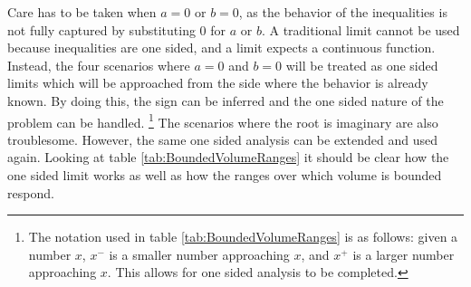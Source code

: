 Care has to be taken when $a=0$ or $b=0$, as the behavior of the inequalities is not fully captured by substituting $0$ for $a$ or $b$. A traditional limit cannot be used because inequalities are one sided, and a limit expects a continuous function. Instead, the four scenarios where $a=0$ and $b=0$ will be treated as one sided limits which will be approached from the side where the behavior is already known. By doing this, the sign can be inferred and the one sided nature of the problem can be handled. \footnote{The notation used in table \ref{tab:BoundedVolumeRanges} is as follows: given a number $x$, $x^-$ is a smaller number approaching $x$, and $x^+$ is a larger number approaching $x$. This allows for one sided analysis to be completed.} The scenarios where the root is imaginary are also troublesome. However, the same one sided analysis can be extended and used again. Looking at table \ref{tab:BoundedVolumeRanges} it should be clear how the one sided limit works as well as how the ranges over which volume is bounded respond.

